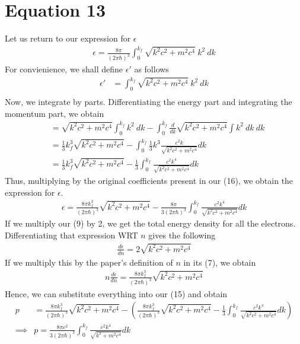 \documentclass{article}
\begin{document}
\section*{Equation 13}
Let us return to our expression for $\epsilon$
\begin{align}
     {\epsilon=\frac{8\pi}{(2\pi\hbar)^3}\int_0^{k_f}\sqrt{k^2c^2+m^2c^4}\ k^2\ dk}
\end{align}
For convienience, we shall define $\epsilon'$ as follows 
\begin{align}
    \epsilon'&=\int_0^{k_f}\sqrt{k^2c^2+m^2c^4}\ k^2\ dk\\
\end{align}
Now, we integrate by parts. Differentiating the energy part and integrating the momentum part, we obtain 
\begin{align}
    &=\sqrt{k^2c^2+m^2c^4}\int_0^{k_f}k^2\ dk -\int_0^{k_f}\frac{d}{dk}\sqrt{k^2c^2+m^2c^4}\int k^2\ dk\ dk\\ 
    &=\frac{1}{3}k_f^3\sqrt{k^2c^2+m^2c^4}-\int_0^{k_f}\frac{1}{3}k^3\frac{c^2k}{\sqrt{k^2c^2+m^2c^4}}dk\\
    &=\frac{1}{3}k_f^3\sqrt{k^2c^2+m^2c^4}-\frac{1}{3}\int_0^{k_f}\frac{c^2k^4}{\sqrt{k^2c^2+m^2c^4}}dk
\end{align}
Thus, multiplying by the original coefficients present in our (16), we obtain the expression for $\epsilon$. 
\begin{align}
    \epsilon=\frac{8\pi k_f^3}{(2\pi\hbar)^3}\sqrt{k^2c^2+m^2c^4}-\frac{8\pi}{3(2\pi\hbar)^3}\int_0^{k_f}\frac{c^2k^4}{\sqrt{k^2c^2+m^2c^4}}dk
\end{align}
If we multiply our (9) by 2, we get the total energy density for all the electrons. Differentiating that expression WRT $n$ gives 
the following 
\begin{align}
    \frac{d\epsilon}{dn}=2\sqrt{k^2c^2+m^2c^4}
\end{align}
If we multiply this by the paper's definition of $n$ in its (7), we obtain 
\begin{align}
    n\frac{d\epsilon}{dn}=\frac{8\pi k_f^3}{(2\pi\hbar)^3}\sqrt{k^2c^2+m^2c^4}
\end{align}
Hence, we can substitute everything into our (15) and obtain 
\begin{align}
    p&=\frac{8\pi k_f^3}{(2\pi\hbar)^3}\sqrt{k^2c^2+m^2c^4}-(\frac{8\pi k_f^3}{(2\pi\hbar)^3}\sqrt{k^2c^2+m^2c^4}-\frac{1}{3}\int_0^{k_f}\frac{c^2k^4}{\sqrt{k^2c^2+m^2c^4}}dk)\\
\implies& \boxed{p=\frac{8\pi c^2}{3(2\pi\hbar)^3}\int_0^{k_f}\frac{c^2k^4}{\sqrt{k^2+m^2c^4}}dk}
\end{align}
\end{document}

